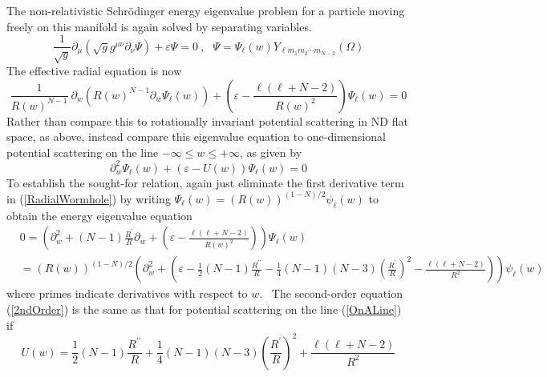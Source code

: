 \documentclass{article}%
\begin{document}
The non-relativistic Schr\"{o}dinger energy eigenvalue problem for a particle
moving freely on this manifold is again solved by separating variables.
\begin{equation}
\frac{1}{\sqrt{g}}\partial_{\mu}\left(  \sqrt{g}g^{\mu\nu}\partial_{\nu}%
\Psi\right)  +\varepsilon\Psi=0\ ,\ \ \ \Psi=\Psi_{\ell}\left(  w\right)
Y_{\ell m_{1}m_{2}\cdots m_{N-2}}\left(  \Omega\right)
\end{equation}
The effective radial equation is now%
\begin{equation}
\frac{1}{R\left(  w\right)  ^{N-1}}~\partial_{w}\left(  R\left(  w\right)
^{N-1}\partial_{w}\Psi_{\ell}\left(  w\right)  \right)  +\left(
\varepsilon-\frac{\ell\left(  \ell+N-2\right)  }{R\left(  w\right)  ^{2}%
}\right)  \Psi_{\ell}\left(  w\right)  =0 \label{RadialWormhole}%
\end{equation}
Rather than compare this to rotationally invariant potential scattering in ND
flat space, as above, instead compare this eigenvalue equation to
one-dimensional potential scattering on the line $-\infty\leq w\leq+\infty$,
as given by%
\begin{equation}
\partial_{w}^{2}\Psi_{\ell}\left(  w\right)  +\left(  \varepsilon-U\left(
w\right)  \right)  \Psi_{\ell}\left(  w\right)  =0 \label{OnALine}%
\end{equation}
To establish the sought-for relation, again just eliminate the first
derivative term in (\ref{RadialWormhole}) by writing $\Psi_{\ell}\left(
w\right)  =\left(  R\left(  w\right)  \right)  ^{\left(  1-N\right)  /2}%
\psi_{\ell}\left(  w\right)  $ to obtain the energy eigenvalue equation%
\begin{align}
&  0=\left(  \partial_{w}^{2}+\left(  N-1\right)  \frac{R^{\prime}}{R}%
\partial_{w}+\left(  \varepsilon-\frac{\ell\left(  \ell+N-2\right)  }{R\left(
w\right)  ^{2}}\right)  \right)  \Psi_{\ell}\left(  w\right) \nonumber\\
&  =\left(  R\left(  w\right)  \right)  ^{\left(  1-N\right)  /2}\left(
\partial_{w}^{2}+\left(  \varepsilon-\frac{1}{2}\left(  N-1\right)
\frac{R^{\prime\prime}}{R}-\frac{1}{4}\left(  N-1\right)  \left(  N-3\right)
\left(  \frac{R^{\prime}}{R}\right)  ^{2}-\frac{\ell\left(  \ell+N-2\right)
}{R^{2}}\right)  \right)  \psi_{\ell}\left(  w\right)  \label{2ndOrder}%
\end{align}
where primes indicate derivatives with respect to $w$. \ The second-order
equation (\ref{2ndOrder}) is the same as that for potential scattering on the
line (\ref{OnALine}) if
\begin{equation}
U\left(  w\right)  =\frac{1}{2}\left(  N-1\right)  \frac{R^{\prime\prime}}%
{R}+\frac{1}{4}\left(  N-1\right)  \left(  N-3\right)  \left(  \frac
{R^{\prime}}{R}\right)  ^{2}+\frac{\ell\left(  \ell+N-2\right)  }{R^{2}}
\label{LinePotl}%
\end{equation}
\end{document}
